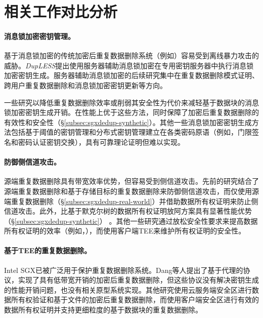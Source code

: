 \section{相关工作对比分析}
\label{sec:sgxdedup-related_work}

\paragraph*{消息锁加密密钥管理。} 基于消息锁加密\cite{bellare2013MLE}的传统加密后重复数据删除系统（例如\cite{adya2002farsite,cox2002pastiche,shah15}）容易受到离线暴力攻击\cite{bellare2013DupLESS}的威胁。{\em DupLESS}\cite{bellare2013DupLESS}提出使用服务器辅助消息锁加密在专用密钥服务器中执行消息锁加密密钥生成。服务器辅助消息锁加密的后续研究集中在重复数据删除模式证明\cite{armknecht2015transparent}、跨用户重复数据删除\cite{zhou2015secdep}和消息锁加密密钥更新\cite{qin17}等方向。

一些研究以降低重复数据删除效率\cite{zhou2015secdep,qin17}或削弱其安全性\cite{li2020Info}为代价来减轻基于数据块的消息锁加密密钥生成开销。\sysnameS 在性能上优于这些方法，同时保障了加密后重复数据删除的有效性和安全性（\S\ref{subsec:sgxdedup-synthetic}）。其他一些消息锁加密密钥生成方法包括基于阈值的密钥管理\cite{duan2014distributed}和分布式密钥管理\cite{liu2015secure}建立在各类密码原语（例如，门限签名\cite{duan2014distributed}和密码认证密钥交换\cite{liu2015secure}），具有可靠理论证明但难以实现。

\paragraph*{防御侧信道攻击。}源端重复数据删除具有带宽效率优势，但容易受到侧信道攻击\cite{harnik2010side}。先前的研究\cite{harnik2010side, li15}结合了源端重复数据删除和基于存储目标的重复数据删除来防御侧信道攻击，而\sysnameS 仅使用源端重复数据删除（\S\ref{subsec:sgxdedup-real-world}）并借助数据所有权证明来防止侧信道攻击。此外，\sysnameS 比基于默克尔树的数据所有权证明放阿方案具有显著性能优势（\S\ref{subsec:sgxdedup-synthetic}） 。其他一些研究通过放松安全性要求来提高数据所有权证明的效率（例如，\cite{pietro12,xu2013weak}），而\sysnameS 使用客户端TEE来维护所有权证明的安全性。

\paragraph*{基于TEE的重复数据删除。} Intel SGX\cite{sgx}已被广泛用于保护重复数据删除系统。Dang等人\cite{dang2017Privacy}提出了基于代理的协议，实现了具有低带宽开销的加密后重复数据删除，但这些协议没有解决密钥生成的性能开销问题，也没有相关原型系统实现。其他研究使用云服务端安全区进行数据所有权验证\cite{you2020Proofs}和基于文件的加密后重复数据删除\cite{fuhry20}，而\sysnameS 使用客户端安全区进行有效的数据所有权证明并支持更细粒度的基于数据块的重复数据删除。
